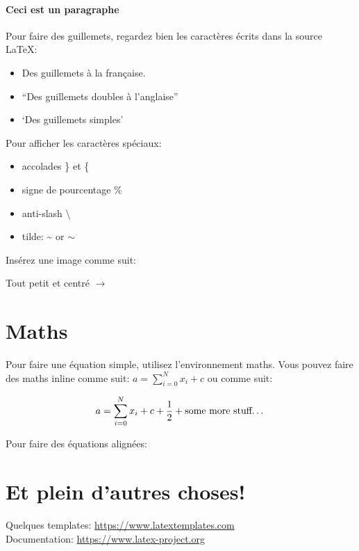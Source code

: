 \documentclass[paper=a4, fontsize=11pt]{article}
\begin{document}
\paragraph{Ceci est un paragraphe}
Pour faire des guillemets, regardez bien les caractères écrits dans la source \LaTeX: 
\begin{itemize}
\item \og Des guillemets à la française\fg{}.
\item ``Des guillemets doubles à l'anglaise''
\item `Des guillemets simples'
\end{itemize}

\vspace{0.5cm} 

Pour afficher les caractères spéciaux:
\begin{itemize}
\item accolades \} et \{
\item signe de pourcentage \%
\item anti-slash \textbackslash
\item tilde: \textasciitilde{} or $\sim$ 
\end{itemize}

\vspace{0.5cm} %


Insérez une image comme suit:


Tout petit et centré $\rightarrow$

\begin{center}
\end{center}

\section{Maths}

Pour faire une équation simple, utilisez l'environnement maths. Vous pouvez faire des maths inline
comme suit: $a = \sum_{i=0}^{N} x_i + c$ ou comme suit:

\[ a = \sum_{i=0}^{N} x_i + c + \dfrac{1}{2} + \text{some more stuff\dots}\]


Pour faire des équations alignées:


\section{Et plein d'autres choses!}

Quelques templates: \url{https://www.latextemplates.com} \\
Documentation: \url{https://www.latex-project.org}







\end{document}
